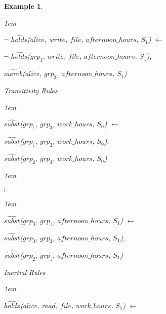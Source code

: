 \documentclass[11pt]{report}
\newtheorem{vexample}{Example}[chapter]
\newenvironment{vquote}
{
  \begin{list}{}{\leftmargin 1em}\item[]
}
{
  \end{list}
}
\begin{document}
\begin{vexample}
\begin{enumerate}
              \begin{vquote}
                $\lnot$ $\hat{holds}$($alice$, $write$, $file$, $afternoon\_hours$, $S_1$) $\leftarrow$

                \hspace{1em}
                $\lnot$ $\hat{holds}$($grp_3$, $write$, $file$, $afternoon\_hours$, $S_1$),

                \hspace{1em}
                $\hat{memb}$($alice$, $grp_3$, $afternoon\_hours$, $S_1$)
              \end{vquote}

            \item
              Transitivity Rules

              \begin{vquote}
                $\hat{subst}$($grp_1$, $grp_3$, $work\_hours$, $S_0$) $\leftarrow$

                \hspace{1em}
                $\hat{subst}$($grp_1$, $grp_2$, $work\_hours$, $S_0$),

                \hspace{1em}
                $\hat{subst}$($grp_2$, $grp_3$, $work\_hours$, $S_0$)
              \end{vquote}

              \begin{vquote}
                \hspace{1em}
                $\vdots$
              \end{vquote}

              \begin{vquote}
                $\hat{subst}$($grp_3$, $grp_1$, $afternoon\_hours$, $S_1$) $\leftarrow$

                \hspace{1em}
                $\hat{subst}$($grp_3$, $grp_2$, $afternoon\_hours$, $S_1$),

                \hspace{1em}
                $\hat{subst}$($grp_2$, $grp_1$, $afternoon\_hours$, $S_1$)
              \end{vquote}

            \item
              Inertial Rules

              \begin{vquote}
                $\hat{holds}$($alice$, $read$, $file$, $work\_hours$, $S_1$) $\leftarrow$


\end{vquote}
\end{enumerate}
\end{vexample}
\end{document}

